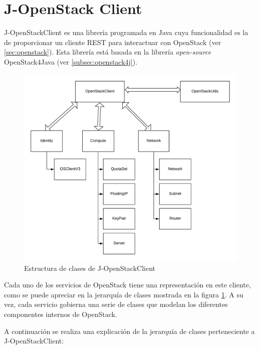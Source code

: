 \section{J-OpenStack Client}
\label{sec:openstackclient}

J-OpenStackClient\cite{openstack4jjavadocbib} es una librería programada en Java cuya funcionalidad es la de proporcionar un cliente \ac{REST} para interactuar con OpenStack (ver \ref{sec:openstack}). Esta librería está basada en la librería \textit{open-source} OpenStack4Java (ver \ref{subsec:openstack4j}).


\begin{figure}[!ht]
	\centering
	\includegraphics[width=1\linewidth]{imagenes/OpenStackClient}
	\caption{Estructura de clases de J-OpenStackClient}
	\label{fig:openstackclient}
\end{figure}

Cada uno de los servicios de OpenStack tiene una representación en este cliente, como se puede apreciar en la jerarquía de clases mostrada en la figura \ref{fig:openstackclient}. A su vez, cada servicio gobierna una serie de clases que modelan los diferentes componentes internos de OpenStack. 

A continuación se realiza una explicación de la jerarquía de clases perteneciente a J-OpenStackClient:


